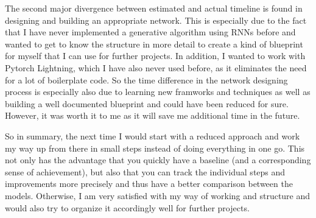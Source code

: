 \documentclass[a4paper, 10pt, xcolor=dvipsnames]{article} %
\begin{document}
The second major divergence between estimated and actual timeline is found in
designing and building an appropriate network. This is especially due to the
fact that I have never implemented a generative algorithm using RNNs before and
wanted to get to know the structure in more detail to create a kind of
blueprint for myself that I can use for further projects. In addition, I wanted
to work with Pytorch Lightning, which I have also never used before, as it
eliminates the need for a lot of boilerplate code. So the time difference in
the network designing process is especially also due to learning new framworks
and techniques as well as building a well documented blueprint and could have
been reduced for sure. However, it was worth it to me as it will save me
additional time in the future.

So in summary, the next time I would start with a reduced approach and work my
way up from there in small steps instead of doing everything in one go. This
not only has the advantage that you quickly have a baseline (and a
corresponding sense of achievement), but also that you can track the individual
steps and improvements more precisely and thus have a better comparison between
the models. Otherwise, I am very satisfied with my way of working and structure
and would also try to organize it accordingly well for further projects.







\printbibliography
\end{document}
